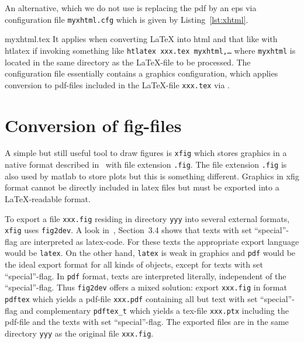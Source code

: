 \documentclass[12pt]{book}
\newcommand{\gls}[1]{#1}
\renewcommand{\index}[1]{ }
\begin{document}
An alternative, which we do not use 
is replacing the pdf by an \gls{eps} via configuration file \texttt{myxhtml.cfg} 
which is given by Listing~\ref{lst:xhtml}. 
%

{myxhtml.tex}
%
It applies when converting \LaTeX{} into html and that like 
with htlatex if invoking something like \texttt{htlatex xxx.tex myxhtml,\ldots} 
where \texttt{myxhtml} is located in the same directory as the \LaTeX-file 
to be processed. 
The configuration file essentially contains a graphics configuration, 
which applies conversion to pdf-files included in the \LaTeX-file \texttt{xxx.tex}
via . 


\section{Conversion of fig-files}\label{sec:fig2dev}

\index{xfig}
\index{fig2dev}
A simple but still useful tool to draw figures is \texttt{xfig} 
which stores graphics in a native format 
described in~\cite{XFigF} with file extension \texttt{.fig}. 
The file extension \texttt{.fig} is also used by matlab to store plots 
but this is something different. 
Graphics in xfig format cannot be directly included in latex files 
but must be exported into a \LaTeX-readable format. 

To export a file \texttt{xxx.fig} residing in directory \texttt{yyy} 
into several external formats, 
\texttt{xfig} uses \texttt{fig2dev}. 
A look in~\cite{XFigF}, Section~3.4 shows that texts with set ``special''-flag 
are interpreted as latex-code. 
For these texts the appropriate export language would be \texttt{latex}. 
On the other hand, \texttt{latex} is weak in graphics 
and \texttt{pdf} would be the ideal export format for all kinds of objects, 
except for texts with set ``special''-flag. 
In \texttt{pdf} format, texts are interpreted literally, 
independent of the ``special''-flag. 
Thus \texttt{fig2dev} offers a mixed solution: 
export \texttt{xxx.fig} in format \texttt{pdftex} which yields a pdf-file 
\texttt{xxx.pdf} containing all but text with set ``special''-flag 
and complementary \texttt{pdftex\_t} which yields a tex-file \texttt{xxx.ptx} 
including the pdf-file and the texts with set ``special''-flag. 
\index{special-flag}%
The exported files are in the same directory \texttt{yyy} 
as the original file \texttt{xxx.fig}. 
\end{document}
